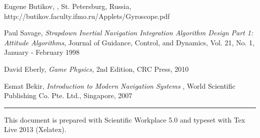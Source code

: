 \documentclass[12pt,a4paper]{article}
\begin{document}
\begin{thebibliography}{99}
 Eugene Butikov, \href{http://butikov.faculty.ifmo.ru/Applets/Gyroscope.pdf%
}{\underline{\color{blue}}},
St. Petersburg, Russia, http://butikov.faculty.ifmo.ru/Applets/Gyroscope.pdf

 Paul Savage, \emph{Strapdown Inertial Navigation
Integration Algorithm Design Part 1: Attitude Algorithms}, Journal of
Guidance, Control, and Dynamics, Vol. 21, No. 1, January - February 1998

 David Eberly, \emph{Game Physics,} 2nd Edition, CRC Press,
2010

 Esmat Bekir, \emph{Introduction to Modern Navigation Systems}%
, World Scientific Publishing Co. Pte. Ltd., Singapore, 2007
\end{thebibliography}

\bigskip

\null
\vfill

\begin{center}
\rule{6in}{0.01in}
\end{center}

\noindent This document is prepared with Scientific Workplace 5.0 and
typeset with Tex Live 2013 (Xelatex).

\noindent\href{http://whymranderson.blogspot.tw/2014/03/how-to-convert-swp-50-special-unicode.html%
}{\underline{\color{blue}}}

\noindent\href{https://drive.google.com/file/d/0B96HmLH-SQVmM1dvYlFiQm9ESGM/edit?usp=sharing%
}{\underline{\color{blue}%
%
}}

\bigskip

%
\end{document}
